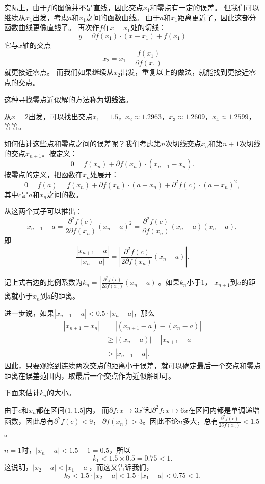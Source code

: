 \documentclass[12pt,UTF8]{ctexbook}
\begin{document}
实际上，由于$f$的图像并不是直线，因此交点$x_1$和零点有一定的误差。
但我们可以继续从$x_1$出发，考虑$a$和$x_1$之间的函数曲线。
由于$a$和$x_1$距离更近了，因此这部分函数曲线更像直线了。
再次作$f$在$x=x_1$处的切线：
$$ y = \partial f(x_1)\cdot (x - x_1) + f(x_1) $$
它与$x$轴的交点
$$ x_2 = x_1 - \frac{f(x_1)}{\partial f(x_1)} $$
就更接近零点。
而我们如果继续从$x_2$出发，重复以上的做法，就能找到更接近零点的交点。

这种寻找零点近似解的方法称为\textbf{切线法}。

从$x=2$出发，可以找出交点$x_1 = 1.5$，$x_2 \approx 1.2963$，$x_3 \approx 1.2609$，$x_4 \approx 1.2599$，等等。

如何估计这些点和零点之间的误差呢？我们考虑第$n$次切线交点$x_n$和第$n+1$次切线的交点$x_{n+1}$。按定义：
$$ 0 = f(x_n) + \partial f(x_n)\cdot (x_{n+1} - x_n). $$
按零点的定义，把函数在$x_n$处展开：
$$ 0 = f(a) = f(x_n) + \partial f(x_n)\cdot (a - x_n) + \partial^2 f(c)\cdot (a - x_n)^2, $$
其中$c$是$a$和$x_n$之间的数。

从这两个式子可以推出：
$$ x_{n+1} - a = \frac{\partial^2 f(c)}{2\partial f(x_n)} (x_n - a)^2 = \frac{\partial^2 f(c)}{\partial f(x_n)} (x_n - a)(x_n - a),$$
即
$$ \frac{\left| x_{n+1} - a \right|}{\left| x_n - a \right|} = \left| \frac{\partial^2 f(c)}{2\partial f(x_n)} (x_n - a)\right|.$$

记上式右边的比例系数为$k_n =  \left|\frac{\partial^2 f(c)}{2\partial f(x_n)} (x_n - a)\right|$。如果$k_n$小于$1$，
$x_{n+1}$到$a$的距离就小于$x_n$到$a$的距离。

进一步说，如果$\left| x_{n+1} - a \right| < 0.5 \cdot \left| x_n - a \right|$，那么
\begin{align*}
    \left| x_{n+1} - x_n \right| &= \left| (x_{n+1} - a) - (x_n - a) \right| \\
    &\geqslant  \left| (x_n - a) \right| - \left| x_{n+1} - a \right| \\
    &> \left| x_{n+1} - a \right|.
\end{align*}
因此，只要观察到连续两次交点的距离小于误差，就可以确定最后一个交点和零点距离在误差范围内，取最后一个交点作为近似解即可。

下面来估计$k_n$的大小。

由于$c$和$x_n$都在区间$(1,1.5]$内，
而$\partial f: x\mapsto 3x^2$和$\partial^2 f: x\mapsto 6x$在区间内都是单调递增函数，因此总有$\partial^2 f(c) < 9$，
$\partial f(x_n) > 3$。因此不论$n$多大，总有$\frac{\partial^2 f(c)}{2\partial f(x_n)} < 1.5$。

$n=1$时，$|x_n - a| < 1.5 - 1 = 0.5$，所以
$$k_1 < 1.5 \times 0.5 = 0.75 < 1.$$
这说明，$|x_2 - a| < |x_1 - a|$，而这又告诉我们，
$$k_2 < 1.5 \cdot |x_2 - a| < 1.5 \cdot |x_1 - a| <0.75 < 1.$$
\end{document}
